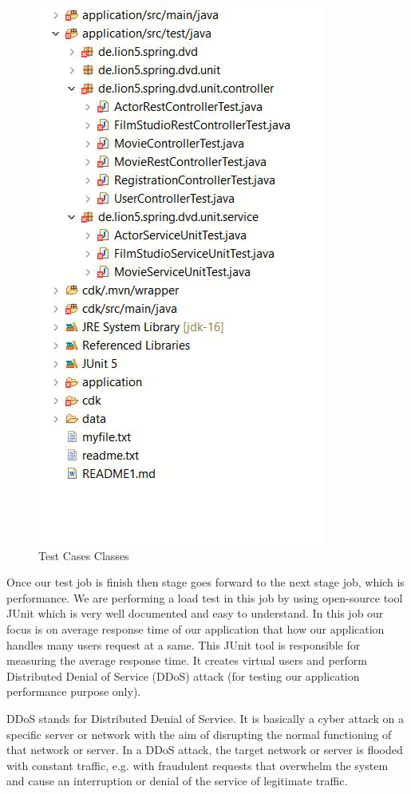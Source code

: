 \begin{figure}[htbp]
\centerline{\includegraphics[scale=0.7]{images/keyur_wakeel/Test_Cases_Classes.JPG}}
\label{fig:}
\caption{Test Cases Classes}
\end{figure}

Once our test job is finish then stage goes forward to the next stage job, which is performance. We are performing a load test in this job by using open-source tool JUnit which is very well documented and easy to understand. In this job
our focus is on average response time of our application that how our application handles many users request at a same. This JUnit tool is responsible for measuring the average response time. It creates virtual users and perform Distributed Denial of Service (DDoS) attack (for testing our application performance purpose only).

DDoS stands for Distributed Denial of Service. It is basically a cyber attack on a specific server or network with the aim of disrupting the normal functioning of that network or server. In a DDoS attack, the target network or server is flooded with constant traffic, e.g. with fraudulent requests that overwhelm the system and cause an interruption or
denial of the service of legitimate traffic.

